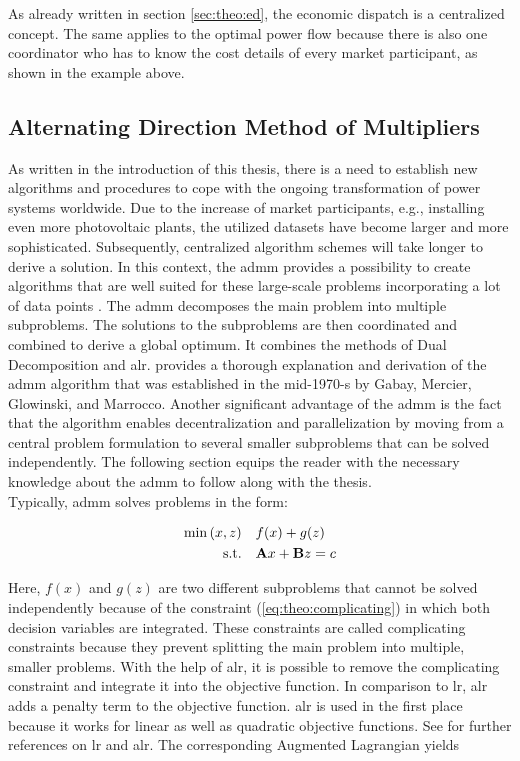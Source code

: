As already written in section \ref{sec:theo:ed}, the economic dispatch is a centralized concept. The same applies to the optimal power flow because there is also one coordinator who has to know the cost details of every market participant, as shown in the example above. 

\subsection{Alternating Direction Method of Multipliers}
\label{sec:theo:admm}

As written in the introduction of this thesis, there is a need to establish new algorithms and procedures to cope with the ongoing transformation of power systems worldwide. Due to the increase of market participants, e.g., installing even more photovoltaic plants, the utilized datasets have become larger and more sophisticated. Subsequently, centralized algorithm schemes will take longer to derive a solution. In this context, the \gls{admm} provides a possibility to create algorithms that are well suited for these large-scale problems incorporating a lot of data points \citep{boyd2010}. The \gls{admm} decomposes the main problem into multiple subproblems. The solutions to the subproblems are then coordinated and combined to derive a global optimum. It combines the methods of Dual Decomposition and \gls{alr}. \citet{boyd2010} provides a thorough explanation and derivation of the \gls{admm} algorithm that was established in the mid-1970-s by Gabay, Mercier, Glowinski, and Marrocco. Another significant advantage of the \gls{admm} is the fact that the algorithm enables decentralization and parallelization by moving from a central problem formulation to several smaller subproblems that can be solved independently. The following section equips the reader with the necessary knowledge about the \gls{admm} to follow along with the thesis.\\

Typically, \gls{admm} solves problems in the form:

\begin{subequations}
	\begin{align}
		\min{(x, z)} \quad & f(x) + g(z) \\
		\text{s.t.} \quad & \vb{A}x + \vb{B}z = c \label{eq:theo:complicating}
	\end{align}
\end{subequations}

Here, $f(x)$ and $g(z)$ are two different subproblems that cannot be solved independently because of the constraint (\ref{eq:theo:complicating}) in which both decision variables are integrated. These constraints are called complicating constraints because they prevent splitting the main problem into multiple, smaller problems. With the help of \gls{alr}, it is possible to remove the complicating constraint and integrate it into the objective function. In comparison to \gls{lr}, \gls{alr} adds a penalty term to the objective function. \gls{alr} is used in the first place because it works for linear as well as quadratic objective functions. See \citet{conejo2006} for further references on \gls{lr} and \gls{alr}. The corresponding Augmented Lagrangian yields

